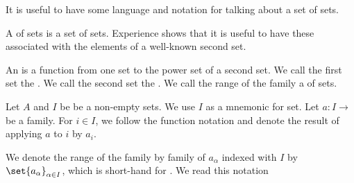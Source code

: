 
\sbasic









\sstart
{}


It is useful to
have some language and
notation for talking about
a set of sets.


A  of sets
is a set of sets.
Experience shows that it is
useful to have these associated
with the elements of a well-known
second set.

An  is a function
from one set to the power set of a second set.
We call the first set the .
We call the second set the .
We call the range of the family
a  of sets.




Let $A$ and $I$ be be a non-empty sets.
We use $I$ as a mnemonic for 
set.
Let $a: I \to $ be a family.
For $i \in I$, we follow the function notation
and denote the result of applying $a$ to $i$ by
$a_{i}$.

We denote the range of the family by
family of $a_{\alpha}$ indexed with $I$
by $\set{a_{\alpha}}_{\alpha \in I}$, which is short-hand
for .
We read this notation 

\strats
